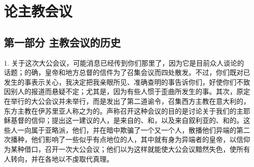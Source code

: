
\chapter{论主教会议}


\par


\section{第一部分 主教会议的历史}

\par

1. 关于这次大公会议，可能消息已经传到你们那里了，因为它是目前众人谈论的话题；的确，皇帝和地方总督的信件为了召集会议而四处散发。不过，你们既对已发生的事表示关心，我决定把我亲眼所见、准确查明的事告诉你们，好使你们不致因别人的报道而悬疑不定；尤其是，因为有些人惯于歪曲所发生的事。其次，原定在举行的大公会议并未举行，而是发出了第二道谕令，召集西方主教在意大利的，东方主教在伊苏里亚人称之为的。声称召开这种会议的目的是讨论关于我们的主耶稣基督的信仰；提出这一建议的人，是来自的、和，以及来自叙利亚的、和的。这些人一向属于亚略派，他们，并在暗中欺骗了一个又一个人，散播他们异端的第二次播种，他们影响了一些似乎有点地位的人，其中就有身为异端者的皇帝，以信仰为某种借口，召开一次大公会议；他们以为这样就能使大公会议黯然失色，使所有人转向，并在各地以不虔取代真理。\par

